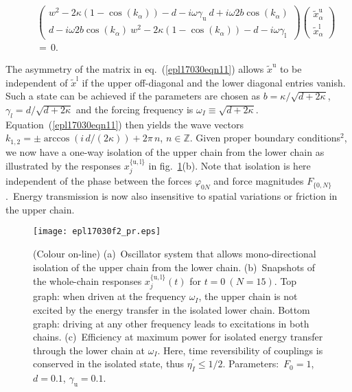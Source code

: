 \documentclass[doublecol,final,edchoice]{epl2}
\begin{document}
\begin{small}
\begin{eqnarray}%
&&\begin{pmatrix}
w^2-2\kappa(1-\cos(k_{\alpha}))-d-i\omega \gamma_{\text{u}}\ d+i\omega 2b\cos(k_{\alpha})\\[4pt]
d-i\omega 2b \cos(k_{\alpha})\ w^2-2\kappa(1-\cos(k_{\alpha}))-d-i\omega \gamma_{\text{l}}
\end{pmatrix}\begin{pmatrix}
\tilde{x}^{\text{u}}_{\alpha}\\[4pt]
\tilde{x}^{\text{l}}_{\alpha}
\end{pmatrix}\nonumber\\
&&=\,0.
\label{epl17030eqn11}
\end{eqnarray}
\end{small}%
The asymmetry of the matrix in eq.~(\ref{epl17030eqn11}) allows $\tilde{x}^{\text{u}}$ to be independent of $\tilde{x}^{\text{l}}$ if the upper off-diagonal and the lower diagonal entries vanish. Such a state can be achieved if the parameters are chosen as $b = \kappa/\sqrt{d + 2\kappa}$, $\gamma_{l} = d/\sqrt{d + 2\kappa}$ and the forcing frequency is $\omega_I\equiv\sqrt{d + 2\kappa}$. Equation~(\ref{epl17030eqn11}) then yields the wave vectors $k_{1,2} =\pm\arccos(i\,d/(2\kappa))+2\pi\,n$, $n\in \mathbb{Z}$. Given proper boundary conditions$^{2}$, we now have a one-way isolation of the upper chain from the lower chain as illustrated by the responses $x_j^{\{\text{u},\text{l}\}}$ in fig.~\ref{epl17030fig2}(b). Note that isolation is here independent of the phase between the forces $\varphi_{0 N}$ and force magnitudes $F_{\{0,N\}}$.~Energy transmission is now also insensitive to spatial variations or friction in the upper chain.

\begin{figure}[t]%
\centering
\texttt{[image: epl17030f2\_pr.eps]}
\caption{(Colour on-line) (a)~Oscillator system that allows mono-directional isolation of the upper chain from the lower chain. (b)~Snapshots of the whole-chain responses $x_{j}^{\{\text{u},\text{l}\}}(t)$ for ${t=0} \ (N=15)$. Top graph: when driven at the frequency $\omega_I$, the upper chain is not excited by the energy transfer in the isolated lower chain. Bottom graph: driving at any other frequency leads to excitations in both chains. (c)~Efficiency at maximum power for isolated energy transfer through the lower chain at $\omega_I$. Here, time reversibility of couplings is conserved in the isolated state, thus $\eta_I^{\prime}\leq1/2$. Parameters:~$F_0=1$, $d=0.1$, $\gamma_{\text{u}}=0.1$.}
\label{epl17030fig2}
\vspace*{-10pt}
\end{figure}
\end{document}
